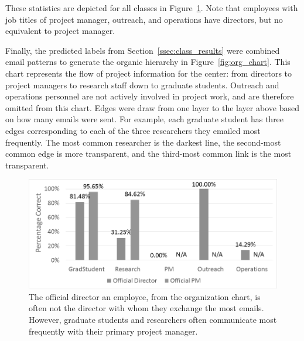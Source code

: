 \documentclass[10pt,twocolumn,conference]{IEEEtran}
\begin{document}
These statistics are depicted for all classes in Figure~\ref{fig:project_analysis}.
Note that employees with job titles of project manager, outreach, and operations have directors, but no equivalent to project manager.

Finally, the predicted labels from Section~\ref{ssec:class_results} were combined email patterns to generate the organic hierarchy in Figure~\ref{fig:org_chart}.
This chart represents the flow of project information for the center: from directors to project managers to research staff down to graduate students.
Outreach and operations personnel are not actively involved in project work, and are therefore omitted from this chart.
Edges were draw from one layer to the layer above based on how many emails were sent.
For example, each graduate student has three edges corresponding to each of the three researchers they emailed most frequently.
The most common researcher is the darkest line, the second-most common edge is more transparent, and the third-most common link is the most transparent.

\begin{figure}[t]
	\centering
	\includegraphics[width=\columnwidth,trim={1mm 5mm 10mm 2mm},clip]{superior_identification_BW}
    \vspace{-18pt}
	\caption{The official director an employee, from the organization chart, is often not the director with whom they exchange the most emails.  However, graduate students and researchers often communicate most frequently with their primary project manager.}
	\vspace{-24pt}
	\label{fig:project_analysis}
\end{figure}
\end{document}
